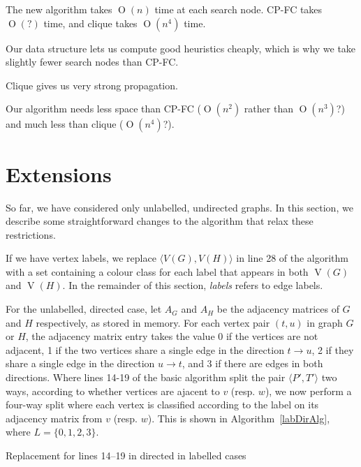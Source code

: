 \documentclass[letterpaper]{article}
\DeclareMathOperator{\V}{V}
\newcommand{\BigO}[1]{\ensuremath{\operatorname{O}\left(#1\right)}}
\begin{document}
The new algorithm takes $\BigO{n}$ time at each search node. CP-FC takes $\BigO{?}$ time,
and clique takes $\BigO{n^4}$ time.

Our data structure lets us compute good heuristics cheaply, which is why we take
slightly fewer search nodes than CP-FC.

Clique gives us very strong propagation.

Our algorithm needs less space than CP-FC ($\BigO{n^2}$ rather than $\BigO{n^3}$?) and
much less than clique ($\BigO{n^4}$?).

\section{Extensions}

So far, we have considered only unlabelled, undirected graphs. In this section, we
describe some straightforward changes to the algorithm that relax these restrictions.

If we have vertex labels, we replace ${\langle V(G),V(H) \rangle}$ in line 28 of
the algorithm with a set containing a colour class for each label that appears in
both $\V(G)$ and $\V(H)$. In the remainder of this section, \textit{labels} refers to
edge labels.

For the unlabelled, directed case, let $A_G$ and $A_H$ be the adjacency matrices
of $G$ and $H$ respectively, as stored in memory. For each
vertex pair $(t,u)$ in graph $G$ or $H$, the adjacency matrix entry 
takes the value 0 if the vertices are
not adjacent, 1 if the two vertices share a single edge in the direction $t
\rightarrow u$, 2 if they share a single edge in the direction $u \rightarrow
t$, and 3 if there are edges in both directions. Where lines 14-19 of the
basic algorithm split the pair $\langle P',T' \rangle$ two ways, according to whether
vertices are ajacent to $v$ (resp. $w$), we now perform a four-way split where
each vertex is classified according to the label on its adjacency matrix from $v$
(resp. $w$). This is shown in Algorithm~\ref{labDirAlg}, where $L=\{0,1,2,3\}$.

\begin{algorithm}
\DontPrintSemicolon
\nl    {}
\caption{Replacement for lines 14--19 in directed in labelled cases}
\label{labDirAlg}
\end{algorithm}
\end{document}
